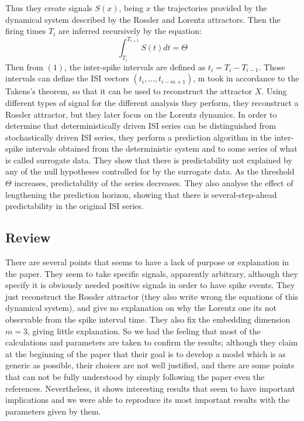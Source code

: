 \documentclass[10pt]{article}
\begin{document}
Thus they create signals $S(x)$, being $x$ the trajectories provided by the dynamical system described by the Rossler and Lorentz attractors. Then the firing times $T_i$ are inferred recursively by the equation:
\begin{equation}
\int_{T_i}^{T_{i+1}} S(t)dt=\Theta
\end{equation}
Then from $(1)$, the inter-spike intervals are defined as $t_i = T_i - T_{i-1}$. Those intervals can define the ISI vectors $(t_i,...,t_{i-m+1})$, m took in accordance to the Takens's theorem, so that it can be used to reconstruct the attractor $X$. Using different types of signal for the different analysis they perform, they reconstruct a Rossler attractor, but they later focus on the Lorentz dynamics. In order to determine that deterministically driven ISI series can be distinguished from stochastically driven ISI series, they perform a prediction algorithm in the inter-spike intervals obtained from the deterministic system and to some series of what is called surrogate data. They show that there is predictability not explained by any of the null hypotheses controlled for by the surrogate data. As the threshold $\Theta$ increases, predictability of the series decreases. They also analyse the effect of lengthening the prediction horizon, showing that there is several-step-ahead predictability in the original ISI series.

\subsection{Review}

There are several points that seems to have a lack of purpose or explanation in the paper. They seem to take specific signals, apparently arbitrary, although they specify it is obviously needed positive signals in order to have spike events. They just reconstruct the Rossler attractor (they also write wrong the equations of this dynamical system), and give no explanation on why the Lorentz one its not observable from the spike interval time. They also fix the embedding dimension $m=3$, giving little explanation. So we had the feeling that most of the calculations and parameters are taken to confirm the results; although they claim at the beginning of the paper that their goal is to develop a model which is as generic as possible, their choices are not well justified, and there are some points that can not be fully understood by simply following the paper even the references. Nevertheless, it shows interesting results that seem to have important implications and we were able to reproduce its most important results with the parameters given by them.
\end{document}
